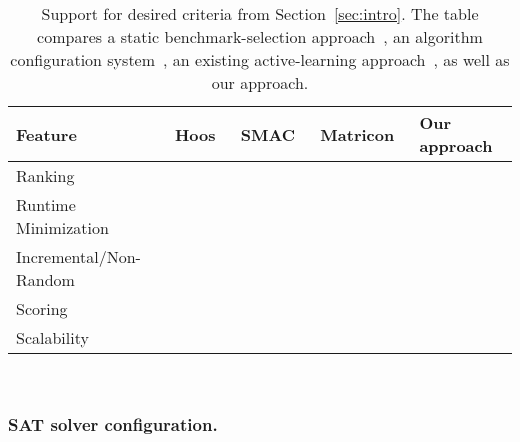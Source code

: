 \documentclass[runningheads]{llncs}
\newcommand{\cmark}{\ding{51}} %
\newcommand{\xmark}{\ding{55}}
\begin{document}
\begin{table}[tbp]
  \centering
  \begin{tabular}{
    m{}
    >{\centering\arraybackslash}m{}
    >{\centering\arraybackslash}m{}
    >{\centering\arraybackslash}m{}
    >{\centering\arraybackslash}m{}
  }
    \hline
    Feature & Hoos~\cite{HoosKSS13} & SMAC~\cite{HutterHL11} & Matricon~\cite{MatriconAFSH21} & Our approach \\
    \hline
    Ranking & \cmark & \xmark & \cmark & \cmark \\
    Runtime Minimization & \xmark & \cmark & \cmark & \cmark \\
    Incremental/Non-Random & \xmark & \xmark & \cmark & \cmark \\
    Scoring & \cmark & \xmark & \xmark & \cmark \\
    Scalability & \cmark & \cmark & \xmark & \cmark \\
    \hline
  \end{tabular}
  ~\\[1em]
  \caption{Support for desired criteria from Section~\ref{sec:intro}.
	The table compares a static benchmark-selection approach~\cite{HoosKSS13}, an algorithm configuration system~\cite{HutterHL11}, an existing active-learning approach~\cite{MatriconAFSH21}, as well as our approach.
  }
  \label{tab:requirements}
\end{table}

\subsubsection{SAT solver configuration.}
\end{document}
